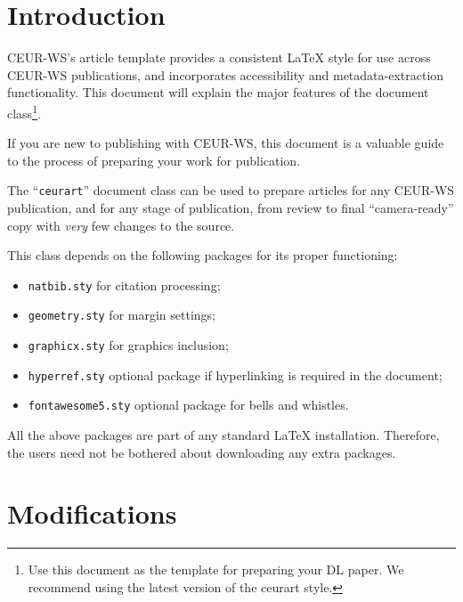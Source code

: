 \documentclass[
]{ceurart}
\begin{document}
\maketitle

\section{Introduction}

CEUR-WS's article template provides a consistent \LaTeX{} style for
use across CEUR-WS publications, and incorporates accessibility and
metadata-extraction functionality. This document will explain the
major features of the document class\footnote{Use this document as the 
template for preparing your DL paper. We recommend using the latest 
version of the ceurart style.}.

If you are new to publishing with CEUR-WS, this document is a valuable
guide to the process of preparing your work for publication.

The ``\verb|ceurart|'' document class can be used to prepare articles
for any CEUR-WS publication, and for any stage of publication, from
review to final ``camera-ready'' copy with {\itshape very} few changes
to the source.

This class depends on the following packages
for its proper functioning:

\begin{itemize}
\item \verb|natbib.sty| for citation processing;
\item \verb|geometry.sty| for margin settings;
\item \verb|graphicx.sty| for graphics inclusion;
\item \verb|hyperref.sty| optional package if hyperlinking is required in
  the document;
\item \verb|fontawesome5.sty| optional package for bells and whistles.
\end{itemize}

All the above packages are part of any
standard \LaTeX{} installation.
Therefore, the users need not be
bothered about downloading any extra packages.

\section{Modifications}
\end{document}
